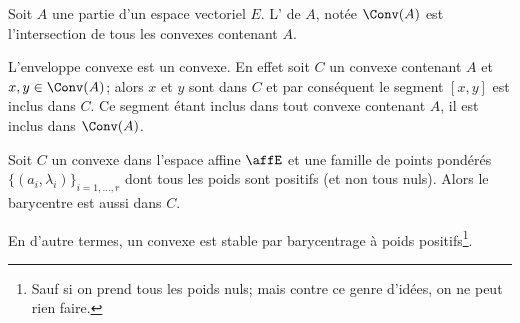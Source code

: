 \begin{definition}      \label{DefNLYYooXUHFUY}
	Soit \( A\) une partie d'un espace vectoriel \( E\). L' de \( A\), notée \( \Conv(A)\) est l'intersection de tous les convexes contenant \( A\).
\end{definition}
L'enveloppe convexe est un convexe. En effet soit \( C\) un convexe contenant \( A\) et \( x,y\in\Conv(A)\); alors \( x\) et \( y \) sont dans \( C\) et par conséquent le segment \( [x,y]\) est inclus dans \( C\). Ce segment étant inclus dans tout convexe contenant \( A\), il est inclus dans \( \Conv(A)\).

\begin{proposition} \label{PropSVvAQzi}
	Soit \( C\) un convexe dans l'espace affine \( \affE\) et une famille de points pondérés \( \{ (a_i,\lambda_i) \}_{i=1,\ldots, r}\) dont tous les poids sont positifs (et non tous nuls). Alors le barycentre est aussi dans \( C\).

	En d'autre termes, un convexe est stable par barycentrage à poids positifs\footnote{Sauf si on prend tous les poids nuls; mais contre ce genre d'idées, on ne peut rien faire.}.
\end{proposition}

